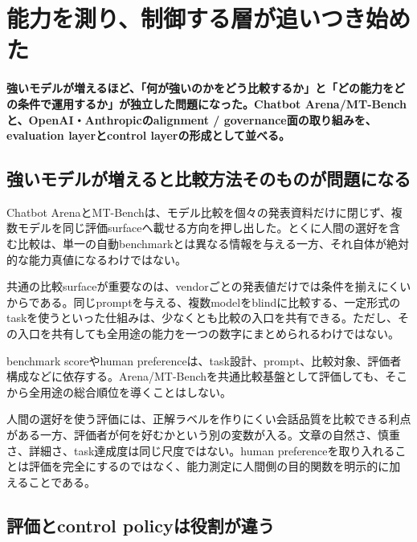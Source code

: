 \section{能力を測り、制御する層が追いつき始めた}
\label{pkg:evaluation-control}
\noindent\textbf{強いモデルが増えるほど、「何が強いのかをどう比較するか」と「どの能力をどの条件で運用するか」が独立した問題になった。Chatbot Arena/MT-Benchと、OpenAI・Anthropicのalignment / governance面の取り組みを、evaluation layerとcontrol layerの形成として並べる。}\autocite{src-14f8acc117f1,src-1df7a91d31ec,src-25adcaa1c831,src-394ea6d17701,src-8f63dfa1697f,src-a1c8df89a3c9,src-b276b4af9d56,src-b2d10cbd609c,src-b6a5fdb87e9f}

\subsection{強いモデルが増えると比較方法そのものが問題になる}

Chatbot ArenaとMT-Benchは、モデル比較を個々の発表資料だけに閉じず、複数モデルを同じ評価surfaceへ載せる方向を押し出した。とくに人間の選好を含む比較は、単一の自動benchmarkとは異なる情報を与える一方、それ自体が絶対的な能力真値になるわけではない。\autocite{src-14f8acc117f1,src-1df7a91d31ec,src-b2d10cbd609c}


共通の比較surfaceが重要なのは、vendorごとの発表値だけでは条件を揃えにくいからである。同じpromptを与える、複数modelをblindに比較する、一定形式のtaskを使うといった仕組みは、少なくとも比較の入口を共有できる。ただし、その入口を共有しても全用途の能力を一つの数字にまとめられるわけではない。\autocite{src-14f8acc117f1,src-1df7a91d31ec,src-b2d10cbd609c}


benchmark scoreやhuman preferenceは、task設計、prompt、比較対象、評価者構成などに依存する。Arena/MT-Benchを共通比較基盤として評価しても、そこから全用途の総合順位を導くことはしない。\autocite{src-14f8acc117f1,src-1df7a91d31ec,src-b2d10cbd609c}


人間の選好を使う評価には、正解ラベルを作りにくい会話品質を比較できる利点がある一方、評価者が何を好むかという別の変数が入る。文章の自然さ、慎重さ、詳細さ、task達成度は同じ尺度ではない。human preferenceを取り入れることは評価を完全にするのではなく、能力測定に人間側の目的関数を明示的に加えることである。\autocite{src-14f8acc117f1,src-1df7a91d31ec,src-b2d10cbd609c}


\subsection{評価とcontrol policyは役割が違う}


